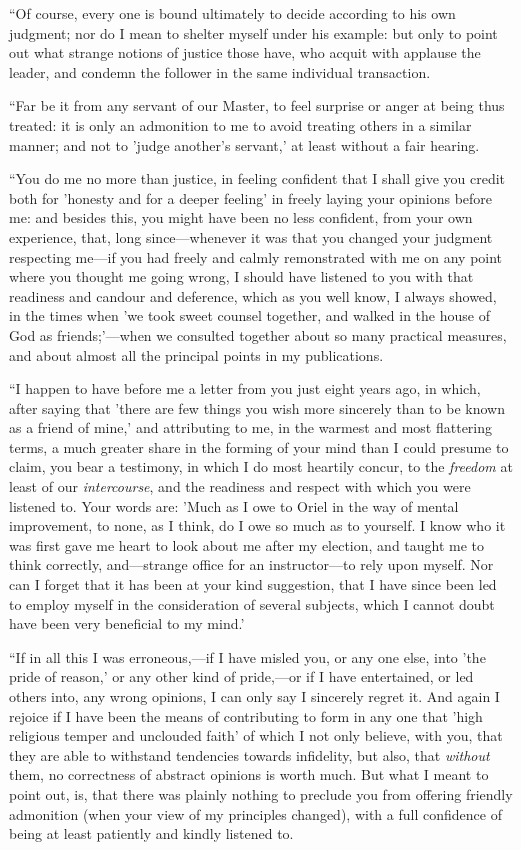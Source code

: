``Of course, every one is bound ultimately to
decide according to his own judgment; nor do I mean to shelter myself
under his example: but only to point out what strange notions of justice
those have, who acquit with applause the leader, and condemn the
follower in the same individual transaction.

``Far be it from any servant of our Master, to feel
surprise or anger at being thus treated: it is only an admonition to me
to avoid treating others in a similar manner; and not to 'judge another's
servant,' at least without a fair hearing.

``You do me no more than justice, in feeling
confident that I shall give you credit both for 'honesty and for a
deeper feeling' in freely laying your opinions before me: and besides
this, you might have been no less confident, from your own experience,
that, long since—whenever it was that you changed your judgment
respecting me—if you had freely and calmly remonstrated with me on any
point where you thought me going wrong, I should have listened to you
with that readiness and candour and deference, which as you well know, I
always showed, in the times when 'we took sweet counsel together, and
walked in the house of God as friends;'—when we consulted together
about so many practical measures, and about almost all the principal
points in my publications.

``I happen to have before me a letter from you just
eight years ago, in which, after saying that 'there are few things you
wish more sincerely than to be known as a friend of mine,' and
attributing to me, in the warmest and most flattering terms, a
much greater share in the forming of your mind than I could presume to
claim, you bear a testimony, in which I do most heartily concur, to the \emph{freedom}
at least of our \emph{intercourse}, and the readiness and respect with
which you were listened to. Your words are: 'Much as I owe to Oriel in
the way of mental improvement, to none, as I think, do I owe so much as
to yourself. I know who it was first gave me heart to look about me
after my election, and taught me to think correctly, and—strange
office for an instructor—to rely upon myself. Nor can I forget that it
has been at your kind suggestion, that I have since been led to employ
myself in the consideration of several subjects, which I cannot doubt
have been very beneficial to my mind.'

``If in all this I was erroneous,—if I have
misled you, or any one else, into 'the pride of reason,' or any other
kind of pride,—or if I have entertained, or led others into, any wrong
opinions, I can only say I sincerely regret it. And again I rejoice if I
have been the means of contributing to form in any one that 'high
religious temper and unclouded faith' of which I not only believe, with
you, that they are able to withstand tendencies towards infidelity, but
also, that \emph{without} them, no correctness of abstract opinions is
worth much. But what I meant to point out, is, that there was plainly
nothing to preclude you from offering friendly admonition (when your
view of my principles changed), with a full confidence of being at least
patiently and kindly listened to.

